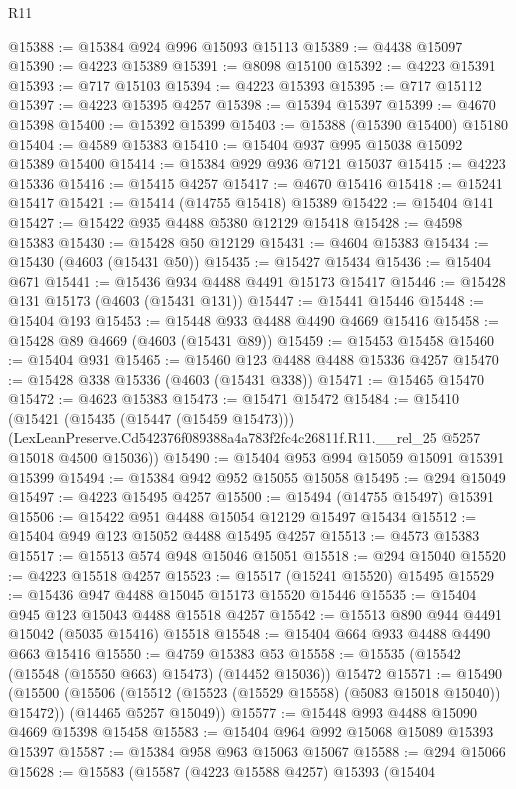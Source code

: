 \begin{lexlean}{R11}
\begin{coremodule}
@15388 := @15384 @924 @996 @15093 @15113
@15389 := @4438 @15097
@15390 := @4223 @15389
@15391 := @8098 @15100
@15392 := @4223 @15391
@15393 := @717 @15103
@15394 := @4223 @15393
@15395 := @717 @15112
@15397 := @4223 @15395 @4257
@15398 := @15394 @15397
@15399 := @4670 @15398
@15400 := @15392 @15399
@15403 := @15388 (@15390 @15400) @15180
@15404 := @4589 @15383
@15410 := @15404 @937 @995 @15038 @15092 @15389 @15400
@15414 := @15384 @929 @936 @7121 @15037
@15415 := @4223 @15336
@15416 := @15415 @4257
@15417 := @4670 @15416
@15418 := @15241 @15417
@15421 := @15414 (@14755 @15418) @15389
@15422 := @15404 @141
@15427 := @15422 @935 @4488 @5380 @12129 @15418
@15428 := @4598 @15383
@15430 := @15428 @50 @12129
@15431 := @4604 @15383
@15434 := @15430 (@4603 (@15431 @50))
@15435 := @15427 @15434
@15436 := @15404 @671
@15441 := @15436 @934 @4488 @4491 @15173 @15417
@15446 := @15428 @131 @15173 (@4603 (@15431 @131))
@15447 := @15441 @15446
@15448 := @15404 @193
@15453 := @15448 @933 @4488 @4490 @4669 @15416
@15458 := @15428 @89 @4669 (@4603 (@15431 @89))
@15459 := @15453 @15458
@15460 := @15404 @931
@15465 := @15460 @123 @4488 @4488 @15336 @4257
@15470 := @15428 @338 @15336 (@4603 (@15431 @338))
@15471 := @15465 @15470
@15472 := @4623 @15383
@15473 := @15471 @15472
@15484 := @15410
    (@15421
      (@15435 (@15447 (@15459 @15473)))
      (LexLeanPreserve.Cd542376f089388a4a783f2fc4c26811f.R11.__rel_25 @5257 @15018 @4500 @15036))
@15490 := @15404 @953 @994 @15059 @15091 @15391 @15399
@15494 := @15384 @942 @952 @15055 @15058
@15495 := @294 @15049
@15497 := @4223 @15495 @4257
@15500 := @15494 (@14755 @15497) @15391
@15506 := @15422 @951 @4488 @15054 @12129 @15497 @15434
@15512 := @15404 @949 @123 @15052 @4488 @15495 @4257
@15513 := @4573 @15383
@15517 := @15513 @574 @948 @15046 @15051
@15518 := @294 @15040
@15520 := @4223 @15518 @4257
@15523 := @15517 (@15241 @15520) @15495
@15529 := @15436 @947 @4488 @15045 @15173 @15520 @15446
@15535 := @15404 @945 @123 @15043 @4488 @15518 @4257
@15542 := @15513 @890 @944 @4491 @15042 (@5035 @15416) @15518
@15548 := @15404 @664 @933 @4488 @4490 @663 @15416
@15550 := @4759 @15383 @53
@15558 := @15535 (@15542 (@15548 (@15550 @663) @15473) (@14452 @15036)) @15472
@15571 := @15490
    (@15500
      (@15506 (@15512 (@15523 (@15529 @15558) (@5083 @15018 @15040)) @15472))
      (@14465 @5257 @15049))
@15577 := @15448 @993 @4488 @15090 @4669 @15398 @15458
@15583 := @15404 @964 @992 @15068 @15089 @15393 @15397
@15587 := @15384 @958 @963 @15063 @15067
@15588 := @294 @15066
@15628 := @15583
    (@15587
      (@4223 @15588 @4257)
      @15393
      (@15404

\end{coremodule}
\end{lexlean}
